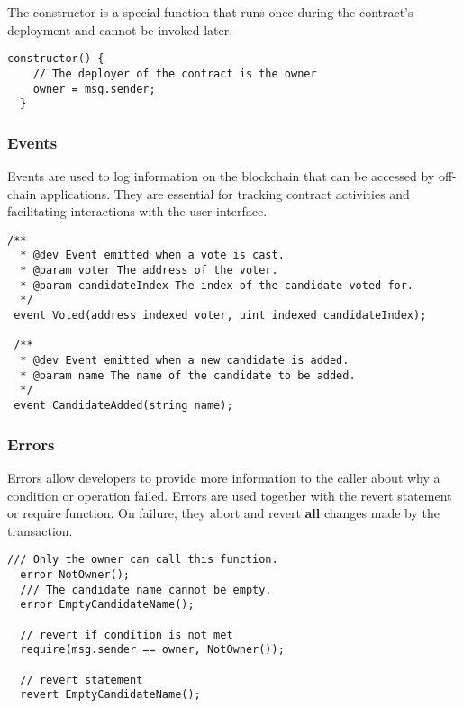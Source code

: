 \documentclass[12pt]{article}
\begin{document}
The constructor is a special function that runs once during the contract's deployment and cannot be invoked later.

\noindent
\begin{minipage}[c]{\textwidth}
\begin{lstlisting}[language=Solidity]
  constructor() {
    // The deployer of the contract is the owner
    owner = msg.sender;
  }
\end{lstlisting}
\end{minipage}

\subsubsection*{Events}

Events are used to log information on the blockchain that can be accessed by off-chain applications. They are essential for tracking contract activities and facilitating interactions with the user interface.

\noindent
\begin{minipage}[c]{\textwidth}
\begin{lstlisting}[language=Solidity]
  /**
  * @dev Event emitted when a vote is cast.
  * @param voter The address of the voter.
  * @param candidateIndex The index of the candidate voted for.
  */
 event Voted(address indexed voter, uint indexed candidateIndex);

 /**
  * @dev Event emitted when a new candidate is added.
  * @param name The name of the candidate to be added.
  */
 event CandidateAdded(string name);
\end{lstlisting}
\end{minipage}

\subsubsection*{Errors}

Errors allow developers to provide more information to the caller about why a condition or operation failed. Errors are used together with the revert statement or require function. On failure, they abort and revert \textbf{all} changes made by the transaction.

\noindent
\begin{minipage}[c]{\textwidth}
\begin{lstlisting}[language=Solidity]
  /// Only the owner can call this function.
  error NotOwner();
  /// The candidate name cannot be empty.
  error EmptyCandidateName();

  // revert if condition is not met
  require(msg.sender == owner, NotOwner());

  // revert statement
  revert EmptyCandidateName();
\end{lstlisting}
\end{minipage}
\end{document}
